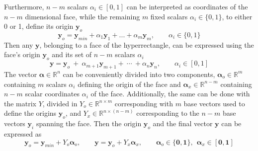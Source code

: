 Furthermore, $n-m$ scalars $\alpha_i\in[0,1]$ can be interpreted as coordinates of the $n-m$ dimensional face, while the remaining $m$ fixed scalars $\alpha_i\in\{0,1\}$, to either 0 or 1, define its origin $\bm{y}_o$
\begin{equation}
    \bm{y}_o = \bm{y}_{min} + \alpha_1 \bm{y}_1+ ... + \alpha_m \bm{y}_m, \qquad \alpha_i \in\{0,1\}
\end{equation} 
Then any $\bm{y}$, belonging to a face of the hyperrectangle, can be expressed using the face's origin $\bm{y}_o$ and its set of $n-m$ scalars $\alpha_i$ 
\begin{equation}
    \bm{y} = \bm{y}_o ~+ ~\alpha_{m+1}\bm{y}_{m+1} +~\cdots~ +\alpha_{n}\bm{y}_{n}, \qquad \alpha_i \in [0,1]
\end{equation}
The vector $\bm{\alpha}\in\mathbb{R}^n$ can be conveniently divided into two components, $\bm{\alpha}_o\in\mathbb{R}^m$ containing $m$ scalars $\alpha_i$ defining the origin of the face and $\bm{\alpha}_x\in\mathbb{R}^{n-m}$ containing $n-m$ scalar coordinates $\alpha_i$ of the face. Additionally, the same can be done with the matrix $Y$, divided in $Y_o\in\mathbb{R}^{n\times m}$ corresponding with $m$ base vectors used to define the origins $\bm{y}_o$, and $Y_x\in\mathbb{R}^{n\times (n-m)}$
 corresponding to the $n\!-\!m$ base vectors $\bm{y}_i$ spanning the face. Then the origin $\bm{y}_o$ and the final vector $\bm{y}$ can be expressed as
 \begin{equation}
    \bm{y}_o = \bm{y}_{min} + Y_o\bm{\alpha}_{o}, \qquad \bm{y} = \bm{y}_o +  Y_x\bm{\alpha}_{x}, \qquad \bm{\alpha}_{o}\in\{\bm{0},\bm{1}\},~~ \bm{\alpha}_{x}\in[\bm{0},\bm{1}]
    \label{eq:matrix_new_y}
\end{equation}


